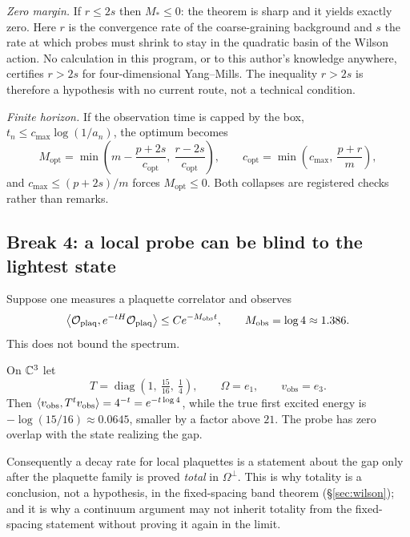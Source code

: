 \emph{Zero margin.} If $r \le 2s$ then $M_* \le 0$: the theorem is
sharp and it yields exactly zero. Here $r$ is the convergence rate of the
coarse-graining background and $s$ the rate at which probes must shrink
to stay in the quadratic basin of the Wilson action. No calculation in
this program, or to this author's knowledge anywhere, certifies
$r > 2s$ for four-dimensional Yang--Mills. The inequality $r > 2s$ is
therefore a hypothesis with no current route, not a technical condition.

\emph{Finite horizon.} If the observation time is capped by the box,
$t_n \le c_{\max}\log(1/a_n)$, the optimum becomes
\begin{equation}
  M_{\mathrm{opt}} = \min\!\left(m - \frac{p+2s}{c_{\mathrm{opt}}},\
  \frac{r-2s}{c_{\mathrm{opt}}}\right),
  \qquad
  c_{\mathrm{opt}} = \min\!\left(c_{\max},\ \frac{p+r}{m}\right),
\end{equation}
and $c_{\max} \le (p+2s)/m$ forces $M_{\mathrm{opt}} \le 0$. Both
collapses are registered checks rather than remarks.

\subsection{Break 4: a local probe can be blind to the lightest state}
\label{sec:break4}

Suppose one measures a plaquette correlator and observes
\begin{equation}
  \left\langle \mathcal{O}_{\mathrm{plaq}}, e^{-tH}\mathcal{O}_{\mathrm{plaq}} \right\rangle
  \le C e^{-M_{\mathrm{obs}} t},
  \qquad M_{\mathrm{obs}} = \log 4 \approx 1.386 .
\end{equation}
This does not bound the spectrum.

\begin{proposition}
\label{prop:break4}
On $\mathbb{C}^3$ let
\[
  T = \operatorname{diag}\!\left(1,\ \tfrac{15}{16},\ \tfrac14\right),
  \qquad \Omega = e_1,\qquad v_{\mathrm{obs}} = e_3 .
\]
Then $\left\langle v_{\mathrm{obs}}, T^t v_{\mathrm{obs}} \right\rangle = 4^{-t} = e^{-t\log 4}$,
while the true first excited energy is
$-\log(15/16) \approx 0.0645$, smaller by a factor above $21$. The probe
has zero overlap with the state realizing the gap.
\end{proposition}

Consequently a decay rate for local plaquettes is a statement about the
gap only after the plaquette family is proved \emph{total} in
$\Omega^{\perp}$. This is why totality is a conclusion, not a hypothesis,
in the fixed-spacing band theorem (\S\ref{sec:wilson}); and it is why a
continuum argument may not inherit totality from the fixed-spacing
statement without proving it again in the limit.


